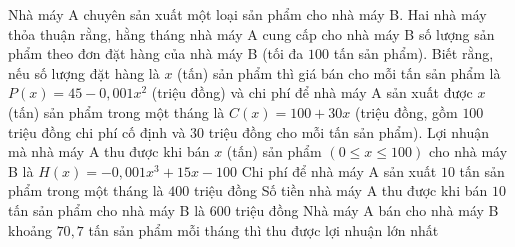 \begin{ex}%
	Nhà máy A chuyên sản xuất một loại sản phẩm cho nhà máy B. Hai nhà máy thỏa thuận rằng, hằng tháng nhà máy A cung cấp cho nhà máy B số lượng sản phẩm theo đơn đặt hàng của nhà máy B (tối đa  $100$ tấn sản phẩm). Biết rằng, nếu số lượng đặt hàng là $x$ (tấn) sản phẩm thì giá bán cho mỗi tấn sản phẩm là $P(x)=45-0{,}001x^2$ (triệu đồng) và chi phí để nhà máy A sản xuất được $x$ (tấn) sản phẩm trong một tháng là $C(x)=100+30x$ (triệu đồng, gồm $100$ triệu đồng chi phí cố định và $30$ triệu đồng cho mỗi tấn sản phẩm).
	 \choiceTF
		{\True Lợi nhuận mà nhà máy A thu được khi bán $x$ (tấn) sản phẩm $(0\leq x \leq 100)$ cho  nhà máy B là $H(x)=-0{,}001x^3+15x-100$}
		{\True Chi phí để nhà máy A sản xuất $10$ tấn sản phẩm trong một tháng là $400$ triệu  đồng}
		{Số tiền nhà máy A thu được khi bán $10$ tấn sản phẩm cho nhà máy B là  $600$ triệu đồng}
		{\True Nhà máy A bán cho nhà máy B khoảng $70{,}7$ tấn sản phẩm mỗi tháng thì thu được lợi nhuận  lớn nhất}
\end{ex}

